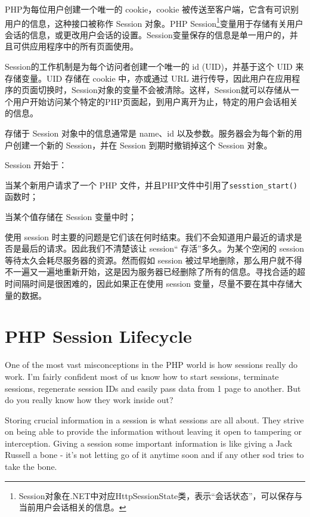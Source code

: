 PHP为每位用户创建一个唯一的 cookie，cookie 被传送至客户端，它含有可识别用户的信息，这种接口被称作 Session 对象。PHP Session\footnote{Session对象在.NET中对应HttpSessionState类，表示“会话状态”，可以保存与当前用户会话相关的信息。}变量用于存储有关用户会话的信息，或更改用户会话的设置。Session变量保存的信息是单一用户的，并且可供应用程序中的所有页面使用。







Session的工作机制是为每个访问者创建一个唯一的 id (UID)，并基于这个 UID 来存储变量。UID 存储在 cookie 中，亦或通过 URL 进行传导，因此用户在应用程序的页面切换时，Session对象的变量不会被清除。这样，Session就可以存储从一个用户开始访问某个特定的PHP页面起，到用户离开为止，特定的用户会话相关的信息。 

存储于 Session 对象中的信息通常是 name、id 以及参数。服务器会为每个新的用户创建一个新的 Session，并在 Session 到期时撤销掉这个 Session 对象。

Session 开始于：

\begin{compactitem}
\item 当某个新用户请求了一个 PHP 文件，并且PHP文件中引用了\texttt{sesstion\_start()}函数时；
\item 当某个值存储在 Session 变量中时；
\end{compactitem}

使用 session 时主要的问题是它们该在何时结束。我们不会知道用户最近的请求是否是最后的请求。因此我们不清楚该让 session“ 存活”多久。为某个空闲的 session 等待太久会耗尽服务器的资源。然而假如 session 被过早地删除，那么用户就不得不一遍又一遍地重新开始，这是因为服务器已经删除了所有的信息。寻找合适的超时间隔时间是很困难的，因此如果正在使用 session 变量，尽量不要在其中存储大量的数据。


\section{PHP Session Lifecycle}


One of the most vast misconceptions in the PHP world is how sessions really do work\cite{php_session_lifecycle}. I'm fairly confident most of us know how to start sessions, terminate sessions, regenerate session IDs and easily pass data from 1 page to another. But do you really know how they work inside out?

Storing crucial information in a session is what sessions are all about. They strive on being able to provide the information without leaving it open to tampering or interception. Giving a session some important information is like giving a Jack Russell a bone - it's not letting go of it anytime soon and if any other sod tries to take the bone.

